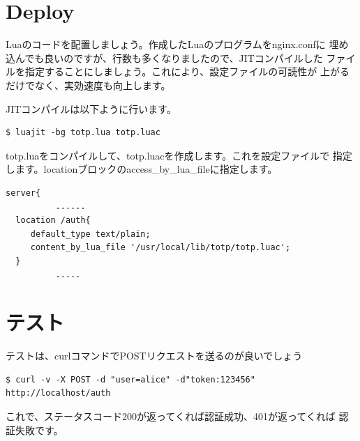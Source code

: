 \section*{Deploy}
Luaのコードを配置しましょう。作成したLuaのプログラムをnginx.confに
埋め込んでも良いのですが、行数も多くなりましたので、JITコンパイルした
ファイルを指定することにしましょう。これにより、設定ファイルの可読性が
上がるだけでなく、実効速度も向上します。

JITコンパイルは以下ように行います。
\begin{lstlisting}[caption=JIT Compile,label=list:compile]
$ luajit -bg totp.lua totp.luac
\end{lstlisting}
%
totp.luaをコンパイルして、totp.luacを作成します。これを設定ファイルで
指定します。locationブロックのaccess\_by\_lua\_fileに指定します。

\begin{lstlisting}[caption=コンパイルしたファイルを設定,label=list:config]
server{
          ......
  location /auth{
     default_type text/plain;
     content_by_lua_file '/usr/local/lib/totp/totp.luac';
  }
          .....
\end{lstlisting}


\section*{テスト}
テストは、curlコマンドでPOSTリクエストを送るのが良いでしょう
\begin{lstlisting}[caption=テスト,label=list:test]
$ curl -v -X POST -d "user=alice" -d"token:123456" http://localhost/auth 
\end{lstlisting}
これで、ステータスコード200が返ってくれば認証成功、401が返ってくれば
認証失敗です。

